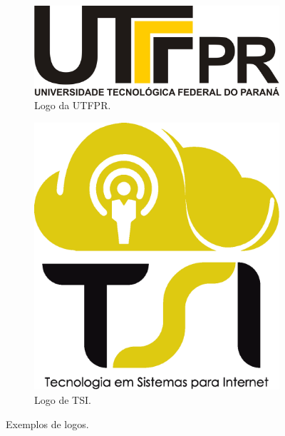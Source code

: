 \documentclass[aspectratio=169]{beamer}
\begin{document}
\begin{frame}[fragile]
	\frametitle{\secname}
	 	\begin{center}
	\begin{figure}[!h]
		\centering
		\begin{subfigure}{.5\textwidth}
			\centering
			\includegraphics[width=0.85\linewidth]{fig/utfpr}
			\caption{Logo da UTFPR.}
			\label{fig:sub1}
		\end{subfigure}%
		\begin{subfigure}{.5\textwidth}
			\centering
			\includegraphics[width= .3\linewidth]{fig/tsi}
			\caption{Logo de TSI.}
			\label{fig:sub2}
		\end{subfigure}
		\caption{Exemplos de logos.}
		\label{fig:test}
	\end{figure}
\end{center}
\end{frame}
\end{document}
